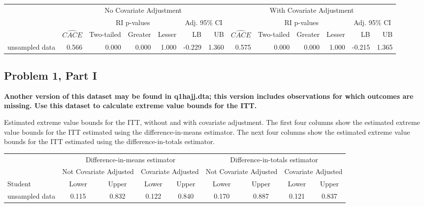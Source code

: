 \documentclass[11pt,notitlepage]{article}
\begin{document}
\begin{table}[h!]\footnotesize\doublespacing
\begin{center}
\begin{tabular}{lrrrrrr|rrrrrr}
  \hline
  & \multicolumn{6}{c|}{No Covariate Adjustment} & \multicolumn{6}{c}{With Covariate Adjustment} \\
  \cline{2-13}
  & & \multicolumn{3}{c}{RI p-values} & \multicolumn{2}{c|}{Adj. 95\% CI} &  & \multicolumn{3}{c}{RI p-values} & \multicolumn{2}{c}{Adj. 95\% CI} \\
  \cline{3-5}\cline{9-11}
 & $\widehat{CACE}$ & Two-tailed & Greater & Lesser & LB & UB & $\widehat{CACE}$ & Two-tailed & Greater & Lesser & LB & UB \\ 
  \hline
unsampled data & 0.566 & 0.000 & 0.000 & 1.000 & -0.229 & 1.360 & 0.575 & 0.000 & 0.000 & 1.000 & -0.215 & 1.365 \\ 
   \hline
\end{tabular}
\end{center}
\end{table}


\subsection{Problem 1, Part I} {\bf Another version of this dataset may be found in q1hajj.dta; this version includes observations for which outcomes are missing.  Use this dataset to calculate extreme value bounds for the ITT.  }


\vspace{1cm}

Estimated extreme value bounds for the ITT, without and with covariate adjustment. The first four columns show the estimated extreme value bounds for the ITT estimated using the difference-in-means estimator. The next four columns show the estimated extreme value bounds for the ITT estimated using the difference-in-totals estimator.

\begin{table}[h!]\small\doublespacing
\begin{center}
\begin{tabular}{lcc|cc|cc|cc}
  \hline
         & \multicolumn{4}{c|}{Difference-in-means estimator} & \multicolumn{4}{c}{Difference-in-totals estimator} \\
         \cline{2-9}
         & \multicolumn{2}{c}{Not Covariate Adjusted} & \multicolumn{2}{c|}{Covariate Adjusted} &  \multicolumn{2}{c}{Not Covariate Adjusted} & \multicolumn{2}{c}{Covariate Adjusted} \\
         \cline{2-9}
 Student & Lower & Upper & Lower & Upper & Lower & Upper & Lower & Upper \\
  \hline
unsampled data & 0.115 & 0.832 & 0.122 & 0.840 & 0.170 & 0.887 & 0.121 & 0.837 \\ 
   \hline
\end{tabular}
\end{center}
\end{table}
\end{document}
